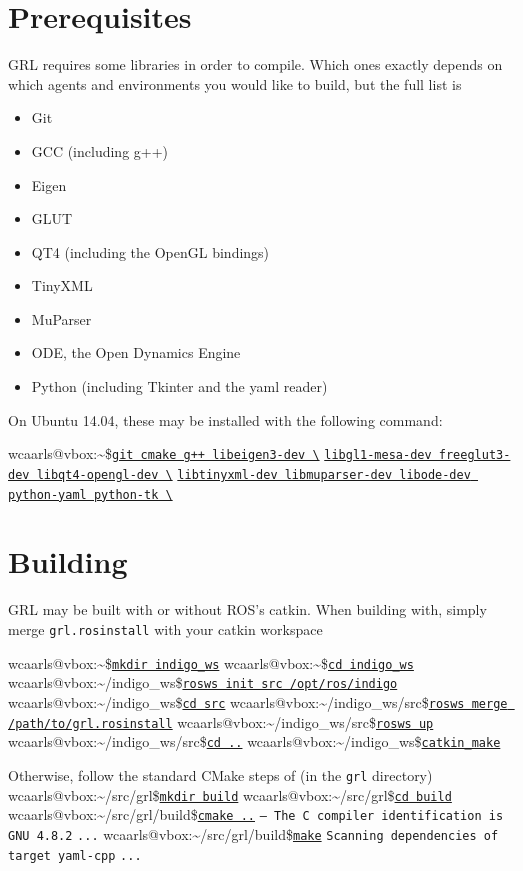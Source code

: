 \documentclass{article}
\makeatletter
\newcommand{\inp}[1]{\texttt{\underline{#1}}}
\newcommand{\txt}[1]{\texttt{#1}}
\newcommand{\promptm}{wcaarls@vbox:\~{}/src/grl\$\xspace}
\newcommand{\promptmb}{wcaarls@vbox:\~{}/src/grl/build\$\xspace}
\newcommand{\prompt}{wcaarls@vbox:\~{}\$\xspace}
\newcommand{\prompth}{wcaarls@vbox:\~{}/indigo\_ws\$\xspace}
\newcommand{\prompths}{wcaarls@vbox:\~{}/indigo\_ws/src\$\xspace}
\newenvironment{code}{\alltt}{\endalltt}
\makeatother
\begin{document}
\section{Prerequisites}

GRL requires some libraries in order to compile. Which ones exactly depends
on which agents and environments you would like to build, but the full list
is

\begin{itemize}
  \item Git
  \item GCC (including g++)
  \item Eigen
  \item GLUT
  \item QT4 (including the OpenGL bindings)
  \item TinyXML
  \item MuParser
  \item ODE, the Open Dynamics Engine
  \item Python (including Tkinter and the yaml reader)
\end{itemize}

On Ubuntu 14.04, these may be installed with the following command:

\begin{code}
\prompt \inp{git cmake g++ libeigen3-dev \textbackslash}
\inp{libgl1-mesa-dev freeglut3-dev libqt4-opengl-dev \textbackslash}
\inp{libtinyxml-dev libmuparser-dev libode-dev python-yaml python-tk \textbackslash}
\end{code}

\section{Building}

GRL may be built with or without ROS's catkin. When building with, simply
merge \txt{grl.rosinstall} with your catkin workspace

\begin{code}
{\color{Gray}\prompt \inp{mkdir indigo\_ws}
\prompt \inp{cd indigo\_ws}
\prompth \inp{rosws init src /opt/ros/indigo}
\prompth \inp{cd src}}
\prompths \inp{rosws merge /path/to/grl.rosinstall} 
\prompths \inp{rosws up}
\prompths \inp{cd ..}
\prompth \inp{catkin\_make}
\end{code}

Otherwise, follow the standard CMake steps of (in the \txt{grl} directory)
\begin{code}
\promptm \inp{mkdir build}
\promptm \inp{cd build}
\promptmb \inp{cmake ..}
\txt{-- The C compiler identification is GNU 4.8.2}
\txt{...}
\promptmb \inp{make}
\txt{Scanning dependencies of target yaml-cpp}
\txt{...}
\end{code}
\end{document}
